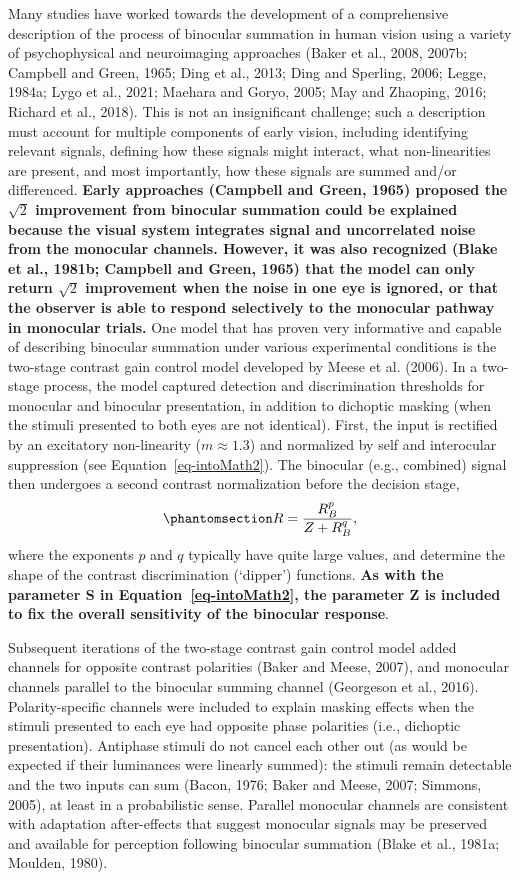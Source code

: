 \documentclass[
  12pt,
]{article}
\begin{document}
Many studies have worked towards the development of a comprehensive
description of the process of binocular summation in human vision using
a variety of psychophysical and neuroimaging approaches (Baker et al.,
2008, 2007b; Campbell and Green, 1965; Ding et al., 2013; Ding and
Sperling, 2006; Legge, 1984a; Lygo et al., 2021; Maehara and Goryo,
2005; May and Zhaoping, 2016; Richard et al., 2018). This is not an
insignificant challenge; such a description must account for multiple
components of early vision, including identifying relevant signals,
defining how these signals might interact, what non-linearities are
present, and most importantly, how these signals are summed and/or
differenced. \textbf{Early approaches (Campbell and Green, 1965)
proposed the \(\sqrt{2}\) improvement from binocular summation could be
explained because the visual system integrates signal and uncorrelated
noise from the monocular channels. However, it was also recognized
(Blake et al., 1981b; Campbell and Green, 1965) that the model can only
return \(\sqrt{2}\) improvement when the noise in one eye is ignored, or
that the observer is able to respond selectively to the monocular
pathway in monocular trials.} One model that has proven very informative
and capable of describing binocular summation under various experimental
conditions is the two-stage contrast gain control model developed by
Meese et al. (2006). In a two-stage process, the model captured
detection and discrimination thresholds for monocular and binocular
presentation, in addition to dichoptic masking (when the stimuli
presented to both eyes are not identical). First, the input is rectified
by an excitatory non-linearity (\(m \approx 1.3\)) and normalized by
self and interocular suppression (see Equation~\ref{eq-intoMath2}). The
binocular (e.g., combined) signal then undergoes a second contrast
normalization before the decision stage,
\begin{equation}\phantomsection\label{eq-IntroMathSecondStage}{
R = \frac{R_B^p}{Z + R_B^q},
}\end{equation} where the exponents \(p\) and \(q\) typically have quite
large values, and determine the shape of the contrast discrimination
(`dipper') functions. \textbf{As with the parameter S in
Equation~\ref{eq-intoMath2}, the parameter Z is included to fix the
overall sensitivity of the binocular response}.

Subsequent iterations of the two-stage contrast gain control model added
channels for opposite contrast polarities (Baker and Meese, 2007), and
monocular channels parallel to the binocular summing channel (Georgeson
et al., 2016). Polarity-specific channels were included to explain
masking effects when the stimuli presented to each eye had opposite
phase polarities (i.e., dichoptic presentation). Antiphase stimuli do
not cancel each other out (as would be expected if their luminances were
linearly summed): the stimuli remain detectable and the two inputs can
sum (Bacon, 1976; Baker and Meese, 2007; Simmons, 2005), at least in a
probabilistic sense. Parallel monocular channels are consistent with
adaptation after-effects that suggest monocular signals may be preserved
and available for perception following binocular summation (Blake et
al., 1981a; Moulden, 1980).
\end{document}
